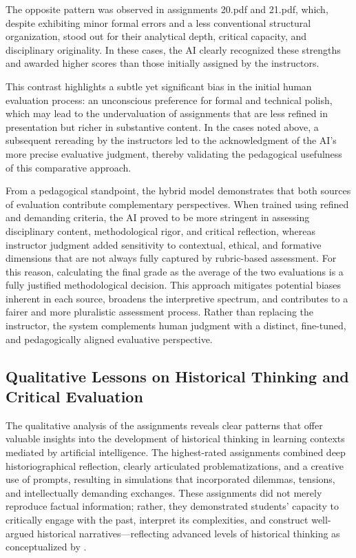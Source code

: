 \documentclass[english]{textolivre}
\begin{document}
The opposite pattern was observed in assignments 20.pdf and 21.pdf, which, despite exhibiting minor formal errors and a less conventional structural organization, stood out for their analytical depth, critical capacity, and disciplinary originality. In these cases, the AI clearly recognized these strengths and awarded higher scores than those initially assigned by the instructors.

This contrast highlights a subtle yet significant bias in the initial human evaluation process: an unconscious preference for formal and technical polish, which may lead to the undervaluation of assignments that are less refined in presentation but richer in substantive content. In the cases noted above, a subsequent rereading by the instructors led to the acknowledgment of the AI’s more precise evaluative judgment, thereby validating the pedagogical usefulness of this comparative approach.

From a pedagogical standpoint, the hybrid model demonstrates that both sources of evaluation contribute complementary perspectives. When trained using refined and demanding criteria, the AI proved to be more stringent in assessing disciplinary content, methodological rigor, and critical reflection, whereas instructor judgment added sensitivity to contextual, ethical, and formative dimensions that are not always fully captured by rubric-based assessment. For this reason, calculating the final grade as the average of the two evaluations is a fully justified methodological decision. This approach mitigates potential biases inherent in each source, broadens the interpretive spectrum, and contributes to a fairer and more pluralistic assessment process. Rather than replacing the instructor, the system complements human judgment with a distinct, fine-tuned, and pedagogically aligned evaluative perspective.

\subsection{Qualitative Lessons on Historical Thinking and Critical Evaluation}
The qualitative analysis of the assignments reveals clear patterns that offer valuable insights into the development of historical thinking in learning contexts mediated by artificial intelligence. The highest-rated assignments combined deep historiographical reflection, clearly articulated problematizations, and a creative use of prompts, resulting in simulations that incorporated dilemmas, tensions, and intellectually demanding exchanges. These assignments did not merely reproduce factual information; rather, they demonstrated students’ capacity to critically engage with the past, interpret its complexities, and construct well-argued historical narratives—reflecting advanced levels of historical thinking as conceptualized by \textcite{seixas2013}.
\end{document}
